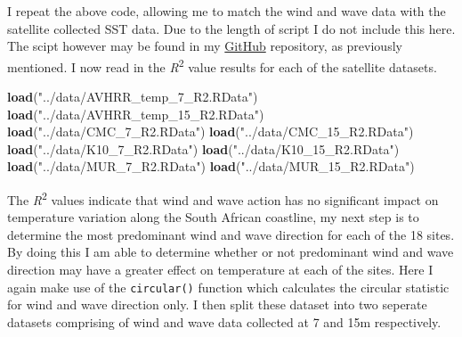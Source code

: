 \documentclass[10pt,A4,]{article}
\newenvironment{Shaded}{\begin{snugshade}}{\end{snugshade}}
\newcommand{\KeywordTok}[1]{\textcolor[rgb]{0.13,0.29,0.53}{\textbf{#1}}}
\newcommand{\StringTok}[1]{\textcolor[rgb]{0.31,0.60,0.02}{#1}}
\newcommand{\CommentTok}[1]{\textcolor[rgb]{0.56,0.35,0.01}{\textit{#1}}}
\newcommand{\OperatorTok}[1]{\textcolor[rgb]{0.81,0.36,0.00}{\textbf{#1}}}
\newcommand{\NormalTok}[1]{#1}
\begin{document}
\begin{Shaded}
\end{Shaded}

I repeat the above code, allowing me to match the wind and wave data
with the satellite collected SST data. Due to the length of script I do
not include this here. The scipt however may be found in my
\href{https://github.com/amierohabrahams/HONOURSPROJECT}{GitHub}
repository, as previously mentioned. I now read in the
\emph{R}\textsuperscript{2} value results for each of the satellite
datasets.

\begin{Shaded}
\begin{Highlighting}[]
\KeywordTok{load}\NormalTok{(}\StringTok{"../data/AVHRR_temp_7_R2.RData"}\NormalTok{)}
\KeywordTok{load}\NormalTok{(}\StringTok{"../data/AVHRR_temp_15_R2.RData"}\NormalTok{)}
\KeywordTok{load}\NormalTok{(}\StringTok{"../data/CMC_7_R2.RData"}\NormalTok{)}
\KeywordTok{load}\NormalTok{(}\StringTok{"../data/CMC_15_R2.RData"}\NormalTok{)}
\KeywordTok{load}\NormalTok{(}\StringTok{"../data/K10_7_R2.RData"}\NormalTok{)}
\KeywordTok{load}\NormalTok{(}\StringTok{"../data/K10_15_R2.RData"}\NormalTok{)}
\KeywordTok{load}\NormalTok{(}\StringTok{"../data/MUR_7_R2.RData"}\NormalTok{)}
\KeywordTok{load}\NormalTok{(}\StringTok{"../data/MUR_15_R2.RData"}\NormalTok{)}
\end{Highlighting}
\end{Shaded}

The \emph{R}\textsuperscript{2} values indicate that wind and wave
action has no significant impact on temperature variation along the
South African coastline, my next step is to determine the most
predominant wind and wave direction for each of the 18 sites. By doing
this I am able to determine whether or not predominant wind and wave
direction may have a greater effect on temperature at each of the sites.
Here I again make use of the \texttt{circular()} function which
calculates the circular statistic for wind and wave direction only. I
then split these dataset into two seperate datasets comprising of wind
and wave data collected at 7 and 15m respectively.
\end{document}
